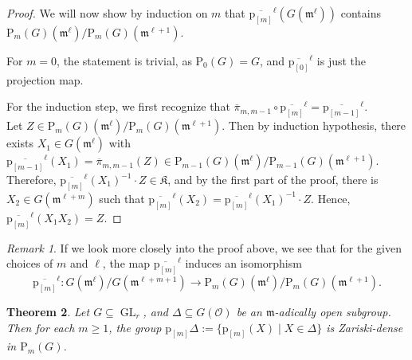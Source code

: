 \documentclass[10pt,a4paper]{amsart}
\theoremstyle{plain} %
\newtheorem{Theorem}{Theorem}[section]
\theoremstyle{definition}
\theoremstyle{remark}
\newtheorem{Remark}[Theorem]{Remark}
\newcommand{\cO}{\mathcal{O}}   %
\newcommand{\fm}{\mathfrak{m}}  %
\newcommand{\fK}{\mathfrak{K}}
\newcommand{\rP}[1]{\mathrm{P}_{\!#1}}
\newcommand{\GL}{\operatorname{GL}}
\newcommand{\prol}[1]{\mathrm{p}_{[#1]}}
\numberwithin{equation}{subsection}
\begin{document}
\begin{proof}
\medskip

We will now show by induction on $m$ that $\overline{\prol{m}}^\ell\left(G(\fm^\ell)\right)$ contains $\rP{m}(G)(\fm^\ell)/\rP{m}(G)(\fm^{\ell+1})$.

For $m=0$, the statement is trivial, as $\rP{0}(G)=G$, and $\overline{\prol{0}}^\ell$ is just the projection map.

For the induction step, we first recognize that $\overline{\pi}_{m,m-1}\circ \overline{\prol{m}}^\ell = \overline{\prol{m-1}}^\ell$.\\
Let $Z\in \rP{m}(G)(\fm^\ell)/\rP{m}(G)(\fm^{\ell+1})$. Then by induction hypothesis, there exists $X_1\in G(\fm^{\ell})$ with
$\overline{\prol{m-1}}^\ell(X_1)=\overline{\pi}_{m,m-1}(Z)\in \rP{{}m-1}(G)(\fm^\ell)/\rP{{}m-1}(G)(\fm^{\ell+1})$.
Therefore, $\overline{\prol{m}}^\ell(X_1)^{-1} \cdot Z \in \fK$, and by the first part of the proof, there is $X_2\in G(\fm^{\ell+m})$ such that $\overline{\prol{m}}^\ell(X_2)=\overline{\prol{m}}^\ell(X_1)^{-1} \cdot Z$.
Hence, $\overline{\prol{m}}^\ell(X_1X_2)=Z$.
\end{proof}

\begin{Remark}
If we look more closely into the proof above, we see that for the given choices of $m$ and $\ell$, the map $\overline{\prol{m}}^\ell$ induces an isomorphism
\[ \overline{\prol{m}}^\ell: G(\fm^\ell)/G(\fm^{\ell+m+1})\to \rP{m}(G)(\fm^\ell)/\rP{m}(G)(\fm^{\ell+1}).\]

\end{Remark}
	
\begin{Theorem}\label{T:prolongated-subgroup-Zariski-dense}
Let $G\subseteq \GL_r$, and $\Delta\subseteq G(\cO)$ be an $\fm$-adically open subgroup.
	Then for each $m\geq 1$, the group $\prol{m}\Delta:=\{ \prol{m}(X)\mid X\in\Delta \}$ is Zariski-dense in $\rP{m}(G)$.
\end{Theorem}	
\end{document}
